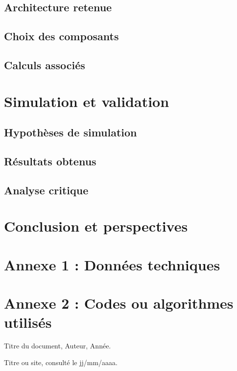 \documentclass[12pt,a4paper]{article}
\begin{document}
\subsection{Architecture retenue}
\subsection{Choix des composants}
\subsection{Calculs associés}





\section{Simulation et validation}

\subsection{Hypothèses de simulation}
\subsection{Résultats obtenus}
\subsection{Analyse critique}



\section{Conclusion et perspectives}





\appendix

\section{Annexe 1 : Données techniques}
\section{Annexe 2 : Codes ou algorithmes utilisés}


\begin{thebibliography}{9}

Titre du document, Auteur, Année.


Titre ou site, consulté le jj/mm/aaaa.


\end{thebibliography}
\end{document}
